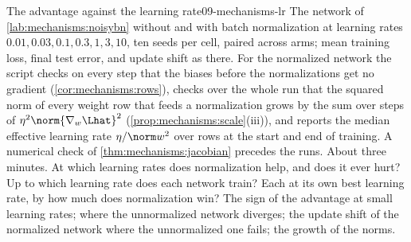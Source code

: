 \begin{refsection}
\begin{lab}{The advantage against the learning rate}{09-mechanisms-lr}\label{lab:mechanisms:lr}
 The network of \cref{lab:mechanisms:noisybn} without and with batch normalization at learning rates $0.01,0.03,0.1,0.3,1,3,10$, ten seeds per cell, paired across arms; mean training loss, final test error, and update shift as there. For the normalized network the script checks on every step that the biases before the normalizations get no gradient (\cref{cor:mechanisms:rows}), checks over the whole run that the squared norm of every weight row that feeds a normalization grows by the sum over steps of $\eta^2\norm{\nabla_w\Lhat}^2$ (\cref{prop:mechanisms:scale}(iii)), and reports the median effective learning rate $\eta/\norm w^2$ over rows at the start and end of training. A numerical check of \cref{thm:mechanisms:jacobian} precedes the runs. About three minutes.
 At which learning rates does normalization help, and does it ever hurt? Up to which learning rate does each network train? Each at its own best learning rate, by how much does normalization win?
 The sign of the advantage at small learning rates; where the unnormalized network diverges; the update shift of the normalized network where the unnormalized one fails; the growth of the norms.
\end{lab}


\end{refsection}
